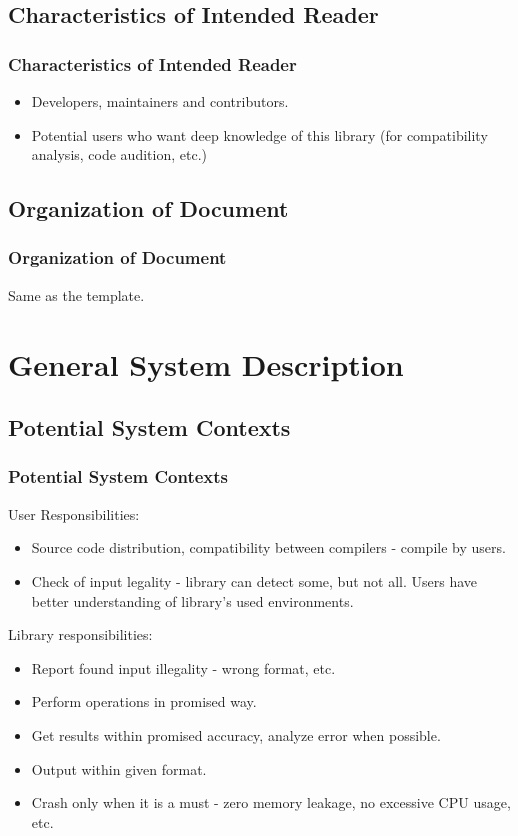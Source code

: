 \documentclass{beamer}
\begin{document}
	\subsection{Characteristics of Intended Reader}
	\begin{frame}
		\frametitle{Characteristics of Intended Reader}
		\begin{itemize}
			\item Developers, maintainers and contributors.
			\item Potential users who want deep knowledge of this library (for compatibility analysis, code audition, etc.)
		\end{itemize}
	\end{frame}

	\subsection{Organization of Document}
	\begin{frame}
		\frametitle{Organization of Document}
		Same as the template.
	\end{frame}

	\section{General System Description}
	\subsection{Potential System Contexts}
	\begin{frame}
		\frametitle{Potential System Contexts}
		User Responsibilities:
		\begin{itemize}
			\item Source code distribution, compatibility between compilers - compile by users.
			\item Check of input legality - library can detect some, but not all. Users have better understanding of library's used environments.
		\end{itemize}
		Library responsibilities:
		\begin{itemize}
			\item Report found input illegality - wrong format, etc.
			\item Perform operations in promised way.
			\item Get results within promised accuracy, analyze error when possible.
			\item Output within given format.
			\item Crash only when it is a must - zero memory leakage, no excessive CPU usage, etc.
		\end{itemize}
	\end{frame}
\end{document}
